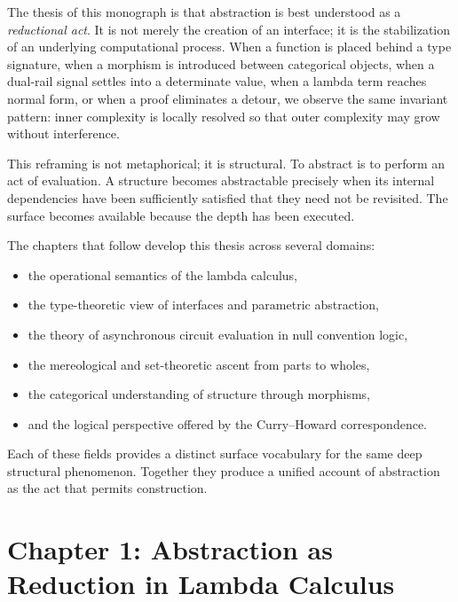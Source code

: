 \documentclass[11pt,letterpaper]{article}
\begin{document}
The thesis of this monograph is that abstraction is best understood as a \emph{reductional act}. It is not merely the creation of an interface; it is the stabilization of an underlying computational process. When a function is placed behind a type signature, when a morphism is introduced between categorical objects, when a dual-rail signal settles into a determinate value, when a lambda term reaches normal form, or when a proof eliminates a detour, we observe the same invariant pattern: inner complexity is locally resolved so that outer complexity may grow without interference.

This reframing is not metaphorical; it is structural. To abstract is to perform an act of evaluation. A structure becomes abstractable precisely when its internal dependencies have been sufficiently satisfied that they need not be revisited. The surface becomes available because the depth has been executed.

The chapters that follow develop this thesis across several domains:

\begin{itemize}[itemsep=0.5em]
    \item the operational semantics of the lambda calculus,
    \item the type-theoretic view of interfaces and parametric abstraction,
    \item the theory of asynchronous circuit evaluation in null convention logic,
    \item the mereological and set-theoretic ascent from parts to wholes,
    \item the categorical understanding of structure through morphisms,
    \item and the logical perspective offered by the Curry--Howard correspondence.
\end{itemize}

Each of these fields provides a distinct surface vocabulary for the same deep structural phenomenon. Together they produce a unified account of abstraction as the act that permits construction.

\newpage

\section{Chapter 1: Abstraction as Reduction in Lambda Calculus}
\end{document}
